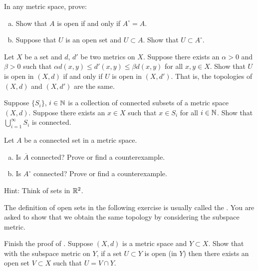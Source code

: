 \begin{exercise}
In any metric space, prove:
\begin{enumerate}[a)]
\item
Show that $A$ is open if and only if $A^\circ = A$.
\item
Suppose that $U$ is an open set and $U \subset A$.  Show
that $U \subset A^\circ$.
\end{enumerate}
\end{exercise}

\begin{exercise}
Let $X$ be a set and $d$, $d'$ be two metrics on $X$.
Suppose there exists an $\alpha > 0$ and $\beta > 0$
such that $\alpha d(x,y) \leq d'(x,y) \leq \beta d(x,y)$ for all $x,y \in X$.
Show that $U$ is open in $(X,d)$ if and only if $U$ is open in $(X,d')$.
That is, the topologies of $(X,d)$ and $(X,d')$ are the same.
\end{exercise}


\begin{exercise}
Suppose $\{ S_i \}$, $i \in {\mathbb{N}}$
is a collection of connected subsets of a metric space $(X,d)$.  Suppose
there exists an $x \in X$ such that $x \in S_i$ for all $i \in {\mathbb{N}}$.
Show that $\bigcup_{i=1}^\infty S_i$ is connected.
\end{exercise}

\begin{exercise}
Let $A$ be a connected set in a metric space.
\begin{enumerate}[a)]
\item
Is $\overline{A}$ connected?  Prove or find a counterexample.
\item
Is $A^\circ$ connected?  Prove or find a counterexample.
\end{enumerate}
Hint: Think of sets in ${\mathbb{R}}^2$.
\end{exercise}

\begin{exnote}
The definition of open sets in the following exercise is usually called the
\emph{}.  You are asked to show that
we obtain the same topology by considering the subspace metric.
\end{exnote}

\begin{exercise} \label{exercise:mssubspace}
Finish the proof of .
Suppose $(X,d)$ is a metric space and $Y \subset X$.  Show that
with the subspace metric on $Y$, if a set $U \subset Y$
is open (in $Y$) then there exists an open set $V \subset X$ such
that $U = V \cap Y$.
\end{exercise}

